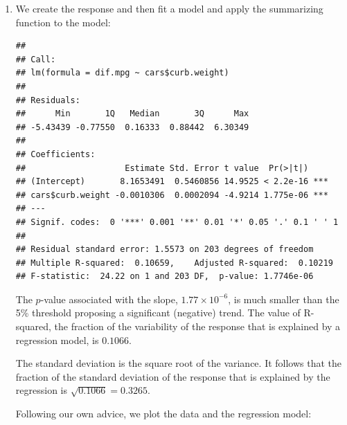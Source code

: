 \documentclass[]{krantz}
\makeatletter
\newenvironment{Shaded}{\begin{snugshade}}{\end{snugshade}}
\newcommand{\KeywordTok}[1]{\textcolor[rgb]{0.13,0.29,0.53}{\textbf{#1}}}
\newcommand{\NormalTok}[1]{#1}
\newcommand{\OperatorTok}[1]{\textcolor[rgb]{0.81,0.36,0.00}{\textbf{#1}}}
\newcommand{\StringTok}[1]{\textcolor[rgb]{0.31,0.60,0.02}{#1}}
\newenvironment{kframe}{%
\medskip{}
\setlength{\fboxsep}{.8em}
 \def\at@end@of@kframe{}%
 \ifinner\ifhmode%
  \def\at@end@of@kframe{\end{minipage}}%
  \begin{minipage}{\columnwidth}%
 \fi\fi%
 \def\FrameCommand##1{\hskip\@totalleftmargin \hskip-\fboxsep
 \colorbox{shadecolor}{##1}\hskip-\fboxsep
     \hskip-\linewidth \hskip-\@totalleftmargin \hskip\columnwidth}%
 \MakeFramed {\advance\hsize-\width
   \@totalleftmargin\z@ \linewidth\hsize
   \@setminipage}}%
 {\par\unskip\endMakeFramed%
 \at@end@of@kframe}
\renewenvironment{Shaded}{\begin{kframe}}{\end{kframe}}
\theoremstyle{definition}
\theoremstyle{definition}
\theoremstyle{definition}
\theoremstyle{remark}
\makeatother
\begin{document}
\begin{enumerate}
\def\labelenumi{\arabic{enumi}.}
\item
  We create the response and then
  fit a model and apply the summarizing function to the model:

\begin{Shaded}
\end{Shaded}

\begin{verbatim}
## 
## Call:
## lm(formula = dif.mpg ~ cars$curb.weight)
## 
## Residuals:
##      Min       1Q   Median       3Q      Max 
## -5.43439 -0.77550  0.16333  0.88442  6.30349 
## 
## Coefficients:
##                    Estimate Std. Error t value  Pr(>|t|)    
## (Intercept)       8.1653491  0.5460856 14.9525 < 2.2e-16 ***
## cars$curb.weight -0.0010306  0.0002094 -4.9214 1.775e-06 ***
## ---
## Signif. codes:  0 '***' 0.001 '**' 0.01 '*' 0.05 '.' 0.1 ' ' 1
## 
## Residual standard error: 1.5573 on 203 degrees of freedom
## Multiple R-squared:  0.10659,    Adjusted R-squared:  0.10219 
## F-statistic:  24.22 on 1 and 203 DF,  p-value: 1.7746e-06
\end{verbatim}

  The \(p\)-value associated with the slope, \(1.77\times 10^{-6}\), is much
  smaller than the 5\% threshold proposing a significant (negative) trend.
  The value of R-squared, the fraction of the variability of the response
  that is explained by a regression model, is \(0.1066\).

  The standard deviation is the square root of the variance. It follows
  that the fraction of the standard deviation of the response that is
  explained by the regression is \(\sqrt{0.1066}= 0.3265\).

  Following our own advice, we plot the data and the regression model:

\begin{Shaded}
\end{Shaded}


\end{enumerate}
\end{document}
